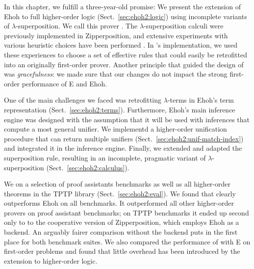 In this chapter, we fulfill a three-year-old promise: We present the extension of
Ehoh to full higher-order logic (Sect.~\ref{sec:ehoh2:logic}) using incomplete variants
of $\lambda$-superposition. We call this prover \ehohii.
%
The $\lambda$-superposition calculi were
previously implemented in Zipperposition, and
extensive experiments with various heuristic choices have been performed
\cite{section-making-ho-work}. In \ehohii{}'s implementation, we used
these experiences to choose a set of effective rules that could easily be
retrofitted into an originally first-order prover. Another principle that guided 
the design of \ehohii{} was \emph{gracefulness}: we made sure that our changes
do not impact the strong first-order performance of E and Ehoh. 


One of the main challenges we faced was retrofitting $\lambda$-terms in Ehoh's
term representation (Sect.~\ref{sec:ehoh2:terms}). Furthermore, Ehoh's main inference
engine was designed with the assumption that it will be used with
inferences that compute a most general unifier. We
implementd a higher-order unification procedure \cite{unif-section}
that can return multiple unifiers (Sect.~\ref{sec:ehoh2:unif-match-index}) and
integrated it in the inference engine. Finally, we extended and adapted the
superposition rule, resulting in an incomplete, pragmatic variant of
$\lambda$-superposition (Sect.~\ref{sec:ehoh2:calculus}).

We  \ehohii{} on a selection of proof assistants benchmarks
as well as all higher-order theorems in the TPTP library \cite{gs-17-tptp}
(Sect.~\ref{sec:ehoh2:eval}). We found
that \ehohii{} clearly outperforms Ehoh on all benchmarks. It outperformed all other higher-order provers on
proof assistant benchmarks; on TPTP benchmarks it ended up second only to 
to the cooperative version of Zipperposition, which employs Ehoh as a
backend. An arguably fairer comparison without the backend puts \ehohii{} in the
first place for both benchmark suites.
We also compared the performance of \ehohii{} with E on first-order
problems and found that little overhead has been introduced by the
extension to higher-order logic.

\kern-1pt %

